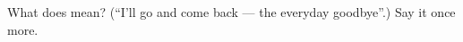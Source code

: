 \begin{tcolorbox}[breakable,colback=teal!4,colframe=teal!35!black,title={Before you move on}]
What does  mean? (\textquotedblleft{}I'll go and come back --- the everyday goodbye\textquotedblright{}.) Say it once more.
\end{tcolorbox}
